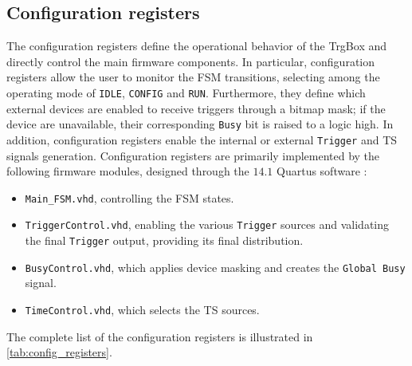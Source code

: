 \subsection{Configuration registers}\label{ssec:config_registers}
The configuration registers define the operational behavior of the TrgBox and directly control the main firmware components. In particular, configuration registers allow the user to monitor the FSM transitions, selecting among the operating mode of \texttt{IDLE}, \texttt{CONFIG} and \texttt{RUN}. Furthermore, they define which external devices are enabled to receive triggers through a bitmap mask; if the device are unavailable, their corresponding \texttt{Busy} bit is raised to a logic high. In addition, configuration registers enable the internal or external \texttt{Trigger} and TS signals generation. Configuration registers are primarily implemented by the following firmware modules, designed through the $14.1$ Quartus software \cite{altera_quartus_ii_14_1}:
\begin{itemize}
	\item \texttt{Main\_FSM.vhd}, controlling the FSM states.
	\item \texttt{TriggerControl.vhd}, enabling the various \texttt{Trigger} sources and validating the final \texttt{Trigger} output, providing its final distribution.
	\item \texttt{BusyControl.vhd}, which applies device masking and creates the \texttt{Global Busy} signal.
	\item \texttt{TimeControl.vhd}, which selects the TS sources.
\end{itemize}
The complete list of the configuration registers is illustrated in \autoref{tab:config_registers}.
